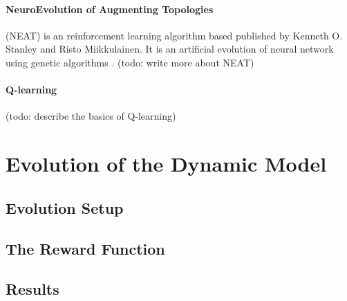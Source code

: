 \paragraph{NeuroEvolution of Augmenting Topologies} (NEAT) is an reinforcement learning algorithm based published by Kenneth O. Stanley and Risto Miikkulainen. It is an artificial evolution of neural network using genetic algorithms \cite{neat}. (todo: write more about NEAT)

\paragraph{Q-learning} (todo: describe the basics of Q-learning)


\section{Evolution of the Dynamic Model}

\subsection{Evolution Setup}

\subsection{The Reward Function}

\subsection{Results}